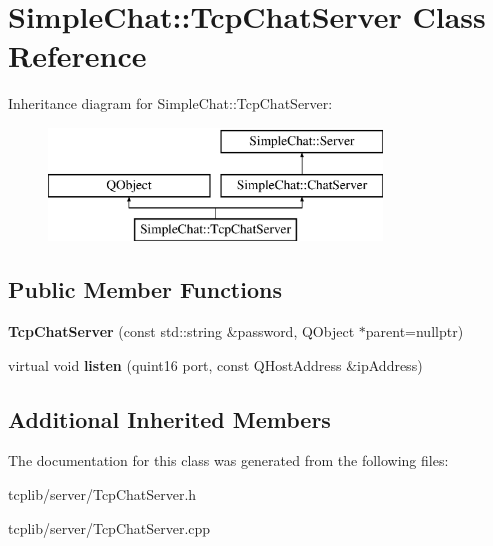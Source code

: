 \hypertarget{classSimpleChat_1_1TcpChatServer}{\section{Simple\-Chat\-:\-:Tcp\-Chat\-Server Class Reference}
\label{classSimpleChat_1_1TcpChatServer}
}
Inheritance diagram for Simple\-Chat\-:\-:Tcp\-Chat\-Server\-:\begin{figure}[H]
\begin{center}
\leavevmode
\includegraphics[height=3.000000cm]{classSimpleChat_1_1TcpChatServer}
\end{center}
\end{figure}
\subsection*{Public Member Functions}
\begin{DoxyCompactItemize}
\item 
\hypertarget{classSimpleChat_1_1TcpChatServer_a4d28d3a86626580c1d9761f570e1184f}{{\bfseries Tcp\-Chat\-Server} (const std\-::string \&password, Q\-Object $\ast$parent=nullptr)}\label{classSimpleChat_1_1TcpChatServer_a4d28d3a86626580c1d9761f570e1184f}

\item 
\hypertarget{classSimpleChat_1_1TcpChatServer_aecd09057f447d2a1f9882cbe319fa36a}{virtual void {\bfseries listen} (quint16 port, const Q\-Host\-Address \&ip\-Address)}\label{classSimpleChat_1_1TcpChatServer_aecd09057f447d2a1f9882cbe319fa36a}

\end{DoxyCompactItemize}
\subsection*{Additional Inherited Members}


The documentation for this class was generated from the following files\-:\begin{DoxyCompactItemize}
\item 
tcplib/server/Tcp\-Chat\-Server.\-h\item 
tcplib/server/Tcp\-Chat\-Server.\-cpp\end{DoxyCompactItemize}

